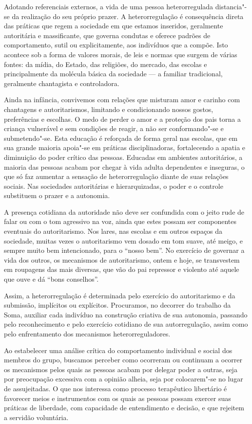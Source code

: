 Adotando referenciais externos, a vida de uma pessoa heterorregulada
distancia"-se da realização do seu próprio prazer. A heterorregulação é
consequência direta das práticas que regem a sociedade em que estamos
inseridos, geralmente autoritária e massificante, que governa condutas e
oferece padrões de comportamento, sutil ou explicitamente, aos
indivíduos que a compõe. Isto acontece sob a forma de valores morais, de
leis e normas que surgem de várias fontes: da mídia, do Estado, das
religiões, do mercado, das escolas e principalmente da molécula básica
da sociedade --- a familiar tradicional, geralmente chantagista e
controladora.

Ainda na infância, convivemos com relações que misturam amor e carinho
com chantagens e autoritarismos, limitando e condicionando nossos
gostos, preferências e escolhas. O medo de perder o amor e a proteção
dos pais torna a criança vulnerável e sem condições de reagir, a não ser
conformando"-se e submetendo"-se. Esta educação é reforçada de forma geral nas
escolas, que em sua grande maioria apoia"-se em práticas disciplinadoras,
fortalecendo a apatia e diminuição do poder crítico das pessoas.
Educadas em ambientes autoritários, a maioria das pessoas acabam por
chegar à vida adulta dependentes e inseguras, o que só faz aumentar a
sensação de heterorregulação diante de suas relações sociais. Nas
sociedades autoritárias e hierarquizadas, o poder e o controle
substituem o prazer e a autonomia.

A presença cotidiana da autoridade não deve ser confundida com o jeito
rude de falar ou com o tom agressivo na voz, ainda que estes possam ser
componentes eventuais do autoritarismo. Nos lares, nas escolas e em
outros espaços da sociedade, muitas vezes o autoritarismo vem dosado em
tom suave, até meigo, e sempre muito bem intencionado, para o ``nosso
bem''. No exercício de governar a vida dos outros, os mecanismos de
autoritarismo, ontem e hoje, se transvestem em roupagens das mais
diversas, que vão do pai repressor e violento até aquele que ouve e dá
``bons conselhos''.

Assim, a heterorregulação é determinada pelo exercício do autoritarismo
e da submissão, implícitos ou explícitos. Procuramos, no decorrer do
trabalho da Soma, auxiliar cada indivíduo na construção criativa de sua
autonomia, passando pelo reconhecimento e pelo exercício cotidiano de
sua autorregulação, assim como pelo enfrentamento dos mecanismos
heterorreguladores.

Ao estabelecer uma análise crítica do comportamento individual e social
dos membros do grupo, buscamos perceber como ocorreram ou continuam a
ocorrer os mecanismos pelos quais as pessoas acabam por delegar poder a
outras, seja por preocupação excessiva com a opinião alheia, seja por
colocarem"-se no lugar de assujeitadas. O que nos interessa como processo
terapêutico libertário é favorecer meios e instrumentos com os quais as
pessoas possam exercer suas práticas de liberdade, com capacidade de
entendimento e decisão, e que rejeitem a servidão voluntária.

